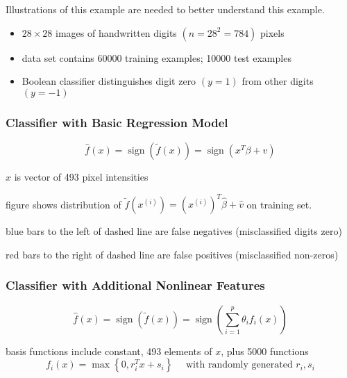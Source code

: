 \begin{remark}
    Illustrations of this example are needed to better understand this example.
\end{remark}

\begin{itemize}
    \item $ 28 \times 28 $ images of handwritten digits $ \left(n=28^{2}=784\right) $ pixels
    \item data set contains 60000 training examples; 10000 test examples
    \item Boolean classifier distinguishes digit zero $ (y=1) $ from other digits $ (y=-1) $

    
\end{itemize}


\subsubsection{Classifier with Basic Regression Model}

\begin{equation}
\hat{f}(x)=\operatorname{sign}(\tilde{f}(x))=\operatorname{sign}\left(x^{T} \beta+v\right)
\end{equation}

$ x $ is vector of 493 pixel intensities

figure shows distribution of $ \tilde{f}\left(x^{(i)}\right)=\left(x^{(i)}\right)^{T} \hat{\beta}+\hat{v} $ on training set.

blue bars to the left of dashed line are false negatives (misclassified digits zero)

red bars to the right of dashed line are false positives (misclassified non-zeros)

\subsubsection{Classifier with Additional Nonlinear Features}

\begin{equation}
\hat{f}(x)=\operatorname{sign}(\tilde{f}(x))=\operatorname{sign}\left(\sum_{i=1}^{p} \theta_{i} f_{i}(x)\right)
\end{equation}

basis functions include constant, 493 elements of $ x $, plus 5000 functions
\begin{equation}
f_{i}(x)=\max \left\{0, r_{i}^{T} x+s_{i}\right\} \quad \text { with randomly generated } r_{i}, s_{i}
\end{equation}

